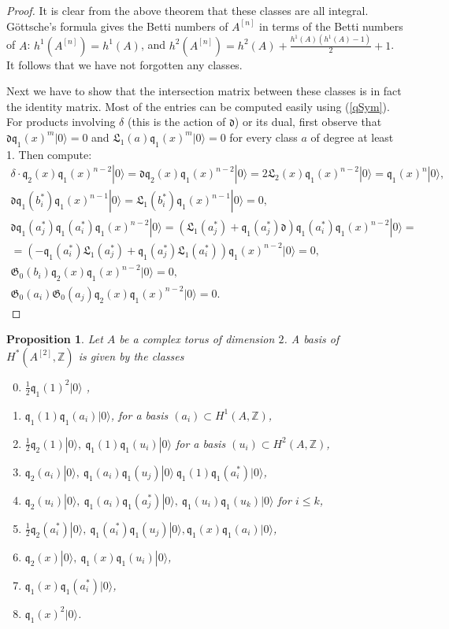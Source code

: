 \documentclass{amsart}
\newcommand{\hilb}[1]{^{[#1]}}
\newcommand{\vac}{|0\rangle}
\newcommand{\G}{\mathfrak{G}}
\newcommand{\q}{\mathfrak{q}}
\newcommand{\Z}{\mathbb{Z}}
\theoremstyle{plain}
\newtheorem{proposition}[theorem]{Proposition}
\theoremstyle{definition}
\theoremstyle{remark}
\begin{document}
\begin{proof} It is clear from the above theorem that these classes are all integral.
G\"ottsche's formula gives the Betti numbers of $A\hilb{n}$ in terms of the Betti numbers of $A$: $h^1(A\hilb{n}) = h^1(A)$, and $h^2(A\hilb{n}) = h^2(A)+ \frac{h^1(A)(h^1(A)-1)}{2} + 1$. It follows that we have not forgotten any classes. 

Next we have to show that the intersection matrix between these classes is in fact the identity matrix. Most of the entries can be computed easily using (\ref{qSym}). For products involving $\delta$ (this is the action of $\mathfrak{d}$) or its dual, first observe that $\mathfrak{d}\q_1(x)^m\vac = 0 $ and $ \mathfrak{L}_1(a)\q_1(x)^m\vac =0$ for every class $a$ of degree at least 1. Then compute:
\begin{gather*}
\delta \cdot\q_2(x)\q_{1}(x)^{n-2} \vac = \mathfrak{d}\q_2(x)\q_{1}(x)^{n-2} \vac = 2 \mathfrak{L}_2(x) \q_{1}(x)^{n-2} \vac = \q_{1}(x)^{n}\vac,
\\
\mathfrak{d}\q_{1}(b_{i}^*)\q_{1}(x)^{n-1}\vac =  \mathfrak{L}_1(b_i^*) \q_{1}(x)^{n-1} \vac = 0,
\\
\mathfrak{d}\q_{1}(a_{j}^*)\q_{1}(a_{i}^*)\q_{1}(x)^{n-2}\vac = \left(\mathfrak{L}_1(a_j^*) +\q_{1}(a_{j}^*)\mathfrak{d}\right)\q_{1}(a_{i}^*)\q_{1}(x)^{n-2}\vac = 
  \\ =\left(-\q_1(a_i^*)\mathfrak{L}_1(a_j^*) + \q_{1}(a_{j}^*)\mathfrak{L}_1(a_i^*)\right)\q_{1}(x)^{n-2}\vac  = 0,
\\
\G_0(b_i)\q_2(x)\q_{1}(x)^{n-2} \vac = 0, 
\\
\G_0(a_i)\G_0(a_j)\q_2(x)\q_{1}(x)^{n-2} \vac = 0.
\end{gather*}
\end{proof}


\begin{proposition}
 Let $A$ be a complex torus of dimension $2$. A basis of $H^*(A\hilb{2},\Z)$ is given by the classes 
 \begin{enumerate}\setcounter{enumi}{-1}
  \item $\frac{1}{2}\q_1(1)^2\vac$ ,
  \item $\q_1(1)\q_1(a_i)\vac$, for a basis $(a_i)\subset H^1(A,\Z)$,
  \item $\frac{1}{2}\q_2(1)\vac,\ \q_1(1)\q_1(u_i)\vac$ for a basis $(u_i)\subset H^2(A,\Z)$,
  \item $\q_2(a_i)\vac, \ \q_1(a_i)\q_1(u_j)\vac\ \q_1(1)\q_1(a^*_i)\vac$,
  \item $\q_2(u_i)\vac, \ \q_1(a_i)\q_1(a^*_j)\vac,\ \q_1(u_i)\q_1(u_k)\vac$ for $i\leq k$,
  \item $\frac{1}{2}\q_2(a^*_i)\vac, \ \q_1(a^*_i)\q_1(u_j)\vac, \q_1(x)\q_1(a_i)\vac$,
  \item $\q_2(x)\vac,\ \q_1(x)\q_1(u_i)\vac$,
  \item $\q_1(x)\q_1(a^*_i)\vac$, 
  \item $\q_1(x)^2\vac$.
 \end{enumerate}

\end{proposition}
\end{document}
